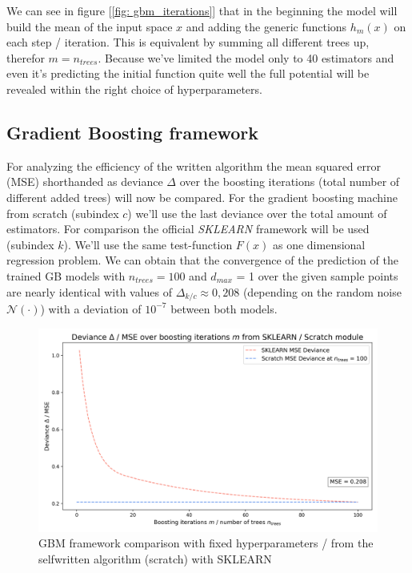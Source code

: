 \documentclass[12pt, a4paper]{article}
\begin{document}
We can see in figure [\ref{fig: gbm_iterations}] that in the beginning the model will build the mean of the input space $x$ and adding the generic functions $h_m(x)$ on each step / iteration. This is equivalent by summing all different trees up, therefor $m = n_{trees}$. Because we've limited the model only to 40 estimators and even it's predicting the initial function quite well the full potential will be revealed within the right choice of hyperparameters.
\subsection{Gradient Boosting framework}
For analyzing the efficiency of the written algorithm the mean squared error (MSE) shorthanded as deviance $\Delta$ over the boosting iterations (total number of different added trees) will now be compared. For the gradient boosting machine from scratch (subindex $c$) we'll use the last deviance over the total amount of estimators. For comparison the official \textit{SKLEARN} framework will be used \cite{Scikit2023} (subindex $k$). We'll use the same test-function $F(x)$ as one dimensional regression problem. We can obtain that the convergence of the prediction of the trained GB models with $n_{trees} = 100$ and $d_{max}$ = 1 over the given sample points are nearly identical with values of $\Delta_{k/c} \approx 0{,}208$  (depending on the random noise $\mathcal{N}(\cdot)$) with a deviation of $10^{-7}$ between both models.
\begin{figure}[!htpb]
    \centering
    \includegraphics[width=1\textwidth,trim={0 0 0 0},clip]{figures/gbm_scratch_sklearn_loss_comparison.png}
    \caption[GBM framework comparison]{GBM framework comparison with fixed hyperparameters / from the selfwritten algorithm (scratch) with SKLEARN \cite{Scikit2023}}
    \label{fig: gbm_comparison}
\end{figure}
\newpage
\end{document}

